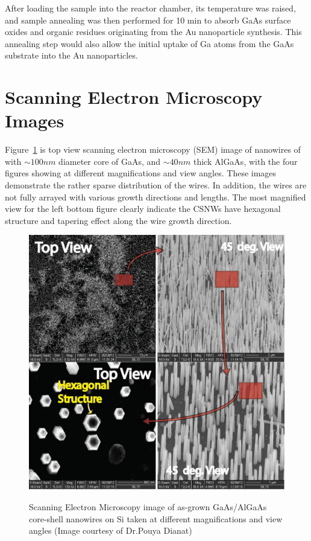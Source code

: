 After loading the sample into the reactor chamber, its temperature was raised,
and sample annealing was then performed for 10 min to absorb GaAs surface
oxides and organic residues originating from the Au nanoparticle synthesis.
This annealing step would also allow the initial uptake of Ga atoms from the
GaAs substrate into the Au nanoparticles. 

\section{Scanning Electron Microscopy Images} 

Figure~\ref{SEMNW} is top view scanning electron microscopy (SEM) image of
nanowires of with $\sim100nm$ diameter core of GaAs, and $\sim40nm$ thick
AlGaAs, with the four figures showing at different magnifications and view
angles. These images demonstrate the rather sparse distribution of the wires.
In addition, the wires are not fully arrayed with various growth directions and
lengths. The most magnified view for the left bottom figure clearly indicate
the CSNWs have hexagonal structure and tapering effect along the wire growth
direction.

\begin{figure}
  \caption{Scanning Electron Microscopy image of as-grown GaAs/AlGaAs core-shell nanowires on Si taken at different magnifications and view angles (Image courtesy of Dr.Pouya Dianat)}
  \centering
  \includegraphics[width=\textwidth]{pictures/Data/SEMNW}
  \label{SEMNW}
\end{figure}

